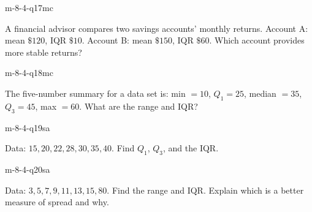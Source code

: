 \begin{practiceQuestion}{m-8-4-q17}{mc}
\begin{questionText}
A financial advisor compares two savings accounts' monthly returns. Account A: mean $\$120$, IQR $\$10$. Account B: mean $\$150$, IQR $\$60$. Which account provides more stable returns?
\end{questionText}
\end{practiceQuestion}

\begin{practiceQuestion}{m-8-4-q18}{mc}
\begin{questionText}
The five-number summary for a data set is: min $= 10$, $Q_1 = 25$, median $= 35$, $Q_3 = 45$, max $= 60$. What are the range and IQR?
\end{questionText}
\end{practiceQuestion}


\begin{practiceQuestion}{m-8-4-q19}{sa}
\begin{questionText}
Data: $15, 20, 22, 28, 30, 35, 40$. Find $Q_1$, $Q_3$, and the IQR.
\end{questionText}
\end{practiceQuestion}

\begin{practiceQuestion}{m-8-4-q20}{sa}
\begin{questionText}
Data: $3, 5, 7, 9, 11, 13, 15, 80$. Find the range and IQR. Explain which is a better measure of spread and why.
\end{questionText}
\end{practiceQuestion}

